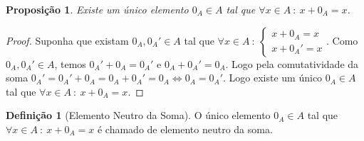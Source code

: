 \documentclass{article}
\newtheorem{prop}{Proposição}[section]
\theoremstyle{theorem}
\theoremstyle{lemma}
\theoremstyle{definition}
\newtheorem{definicao}{Definição}[section]
\theoremstyle{remark}
\begin{document}
\begin{prop}
	Existe um único elemento $0_A\in A$ tal que $ \forall x\in A \: : \: x+0_A = x$.
\end{prop}
\begin{proof}
	Suponha que existam $0_A, 0_A'\in A$ tal que $\forall x\in A \: : \:  \begin{cases} x+0_A = x \\ x+0_A' = x\end{cases}$. Como $0_A,0_A' \in A$, temos $0_A'+ 0_A = 0_A'$ e $0_A + 0_A' = 0_A$. Logo pela comutatividade da soma $0_A' = 0_A' + 0_A = 0_A +0_A' = 0_A \iff 0_A = 0_A'$.  
		Logo existe um único $0_A\in A$ tal que $\forall x\in A \: : \: x+0_A = x$.
\end{proof}
\begin{definicao}[Elemento Neutro da Soma]
	O único elemento $0_A\in A$ tal que $\forall x\in A \: : \: x+0_A  = x$ é chamado de elemento neutro da soma.
\end{definicao}
\end{document}
